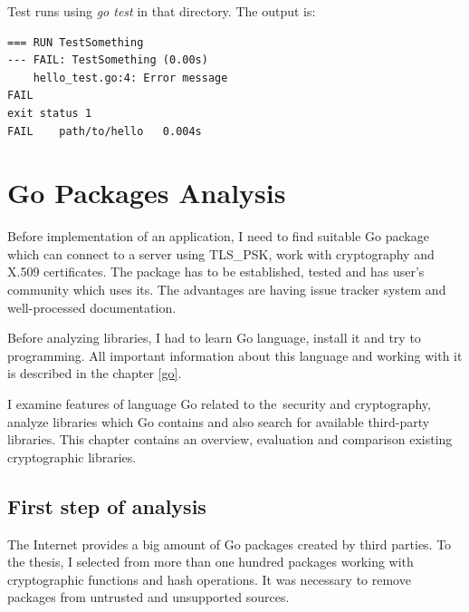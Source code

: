 \documentclass[
  oneside, 12pt, 
  printed, %
  notable,   %
  nolof,     %
  nolot,     %
]{fithesis3}
\begin{document}
Test runs using \textit{go test} in that directory. The output is:
\begin{lstlisting}
=== RUN TestSomething
--- FAIL: TestSomething (0.00s)
	hello_test.go:4: Error message
FAIL
exit status 1
FAIL	path/to/hello	0.004s
\end{lstlisting}



\nocite{harris_2015}
\nocite{kozyra_2014}

\chapter{Go Packages Analysis} %

Before implementation of an application, I need to find suitable Go package which can connect to a 
server using TLS\_PSK, work with cryptography and X.509 certificates. The package has to be 
established, tested and has user's community which uses its. The advantages are having issue 
tracker system and well-processed documentation.

Before analyzing libraries, I had to learn Go language, install it and try to programming. All 
important information about this language and working with it is described in the chapter 
\ref{go}. 

I examine features of language Go related to the~security and cryptography, analyze libraries 
which Go contains and also search for available third-party libraries. This chapter contains an overview, evaluation and comparison existing cryptographic libraries.

\section{First step of analysis}

The Internet provides a big amount of Go packages created by third parties. To the thesis, I 
selected from more than one hundred packages working with cryptographic functions and hash operations. It was necessary to remove packages from untrusted and unsupported sources. 
\end{document}
